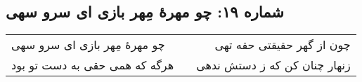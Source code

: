 \begin{center}
\section*{شماره ۱۹: چو مهرۀ مِهر بازی ای سرو سهی}
\label{sec:019}
\begin{longtable}{l p{0.5cm} r}
چو مهرهٔ مِهر بازی ای سرو سهی
&&
چون از گهر حقیقتی حقه تهی
\\
هرگه که همی حقی به دست تو بود
&&
زنهار چنان کن که ز دستش ندهی
\\
\end{longtable}
\end{center}
